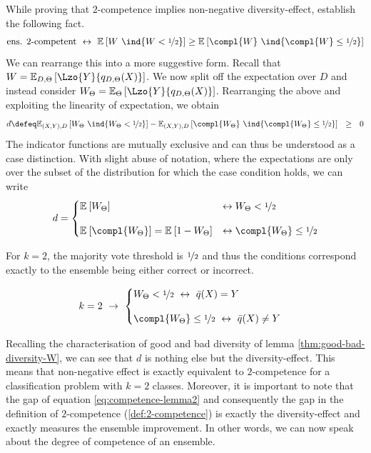 \documentclass[../main.tex]{subfiles}
\begin{document}
While proving that $2$-competence implies non-negative diversity-effect, \citeauthor{theisen_WhenAreEnsembles_2023} establish the following fact.
\begin{align}
\label{eq:competence-lemma2}
\text{ens. $2$-competent} ~\leftrightarrow~ \mathbb{E}_{}\left[ W~\ind{W < \nicefrac{1}{2}} \right] \geq \mathbb{E}_{}\left[ 
\compl{W}~\ind{\compl{W} \leq \nicefrac{1}{2} } 
\right] 
\end{align}
We can rearrange this into a more suggestive form. Recall that $W = \mathbb{E}_{D, \Theta}\left[ \Lzo{Y}{q_{D,\Theta}(X)} \right]$. We now split off the expectation over $D$ and instead consider $W_{\Theta} = \mathbb{E}_{\Theta}\left[ \Lzo{Y}{q_{D, \Theta}(X)} \right]$. Rearranging the above and exploiting the linearity of expectation, we obtain
$$
d \defeq \mathbb{E}_{(X,Y),D }\left[ W_{\Theta} ~\ind{W_{\Theta} < \nicefrac{1}{2}} \right]  - \mathbb{E}_{(X,Y) ,D}\left[ \compl{W_{\Theta}} ~\ind{\compl{W_{\Theta}} \leq \nicefrac{1}{2} } \right] ~ ~ \geq ~ ~  0
$$
The indicator functions are mutually exclusive and can thus be understood as a case distinction. With slight abuse of notation, where the expectations are only over the subset of the distribution for which the case condition holds, we can write
$$
d = 
\begin{cases}
\mathbb{E}_{}\left[ W_{\Theta} \right] & \leftrightarrow W_{\Theta} < \nicefrac{1}{2} \\[1em]
\mathbb{E}_{}\left[ \compl{W_{\Theta}}  \right]  = \mathbb{E}_{}\left[ 1 - W_{\Theta} \right]  & \leftrightarrow \compl{W_{\Theta}} \leq \nicefrac{1}{2} 
\end{cases}
$$

For $k=2$, the majority vote threshold is $\nicefrac{1}{2}$ and thus the conditions correspond exactly to the ensemble being either correct or incorrect.

\begin{align}
\label{eq:gen-error-ratio-binary}
k = 2 ~\rightarrow~ 
\begin{cases}
W_{\Theta}  < \nicefrac{1}{2} ~\leftrightarrow~  \bar{q}(X) = Y \\[1em]
\compl{W_\Theta }  \leq \nicefrac{1}{2} ~\leftrightarrow~ \bar{q}(X) \not= Y
\end{cases}
\end{align}

Recalling the characterisation of good and bad diversity of lemma \ref{thm:good-bad-diversity-W}, we can see that $d$ is nothing else but the diversity-effect. This means that non-negative effect is exactly equivalent to $2$-competence for a classification problem with $k=2$ classes.
Moreover, it is important to note that the gap of equation \ref{eq:competence-lemma2} and consequently the gap in the definition of $2$-competence (\cf \ref{def:2-competence}) is exactly the diversity-effect and exactly measures the ensemble improvement. In other words, we can now speak about the degree of competence of an ensemble.
\end{document}
